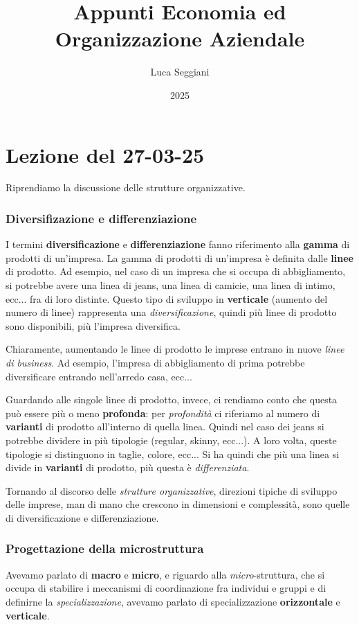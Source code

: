 \documentclass[a4paper,11pt]{article}
\title{Appunti Economia ed Organizzazione Aziendale}
\author{Luca Seggiani}
\date{2025}
\begin{document}
\section{Lezione del 27-03-25}

\thispagestyle{empty}
\pagestyle{fancy}

Riprendiamo la discussione delle strutture organizzative.

\subsubsection{Diversifizazione e differenziazione}
I termini \textbf{diversificazione} e \textbf{differenziazione} fanno riferimento alla \textbf{gamma} di prodotti di un'impresa.
La gamma di prodotti di un'impresa è definita dalle \textbf{linee} di prodotto.
Ad esempio, nel caso di un impresa che si occupa di abbigliamento, si potrebbe avere una linea di jeans, una linea di camicie, una linea di intimo, ecc... fra di loro distinte.
Questo tipo di sviluppo in \textbf{verticale} (aumento del numero di linee) rappresenta una \textit{diversificazione}, quindi più linee di prodotto sono disponibili, più l'impresa diversifica.

Chiaramente, aumentando le linee di prodotto le imprese entrano in nuove \textit{linee di business}.
Ad esempio, l'impresa di abbigliamento di prima potrebbe diversificare entrando nell'arredo casa, ecc...

Guardando alle singole linee di prodotto, invece, ci rendiamo conto che questa può essere più o meno \textbf{profonda}: per \textit{profondità} ci riferiamo al numero di \textbf{varianti} di prodotto all'interno di quella linea.
Quindi nel caso dei jeans si potrebbe dividere in più tipologie (regular, skinny, ecc...).
A loro volta, queste tipologie si distinguono in taglie, colore, ecc...
Si ha quindi che più una linea si divide in \textbf{varianti} di prodotto, più questa è \textit{differenziata}.

\par\smallskip

Tornando al discorso delle \textit{strutture organizzative}, direzioni tipiche di sviluppo delle imprese, man di mano che crescono in dimensioni e complessità, sono quelle di diversificazione e differenziazione. 

\subsubsection{Progettazione della microstruttura}
Avevamo parlato di \textbf{macro} e \textbf{micro}, e riguardo alla \textit{micro}-struttura, che si occupa di stabilire i meccanismi di coordinazione fra individui e gruppi e di definirne la \textit{specializzazione}, avevamo parlato di specializzazione \textbf{orizzontale} e \textbf{verticale}.
\end{document}
